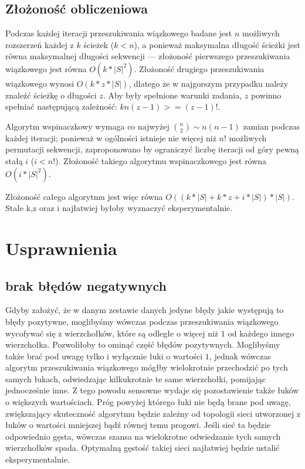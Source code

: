 \documentclass{article}
\begin{document}
\subsection{Złożoność obliczeniowa}
Podczas każdej iteracji przeszukiwania wiązkowego badane jest $n$ możliwych rozszerzeń każdej z $k$ ścieżek ($k<n$), a ponieważ maksymalna długość ścieżki jest równa maksymalnej długości sekwencji --- złożoność pierwszego przeszukiwania wiązkowego jest równa $O(k*|S|^2)$. Złożoność drugiego przeszukiwania wiązkowego wynosi $O(k*z*|S|)$, dlatego że w najgorszym przypadku należy znaleźć ścieżkę o długości $z$. Aby były spełnione warunki zadania, $z$ powinno spełniać następującą zależność: $kn(z-1)>=(z-1)!$.

Algorytm wspinaczkowy wymaga co najwyżej ${{n}\choose{2}}\sim n(n-1)$ zamian podczas każdej iteracji; ponieważ w ogólności istnieje nie więcej niż $n!$ możliwych permutacji sekwencji, zaproponowano by ograniczyć liczbę iteracji od góry pewną stałą $i$ ($i<n!$). Złożoność takiego algorytmu wspinaczkowego jest równa $O(i*|S|^2)$.

Złożoność całego algorytmu jest więc równa $O((k*|S|+k*z+i*|S|)*|S|)$. Stałe k,z oraz i najłatwiej byłoby wyznaczyć eksperymentalnie.
\section{Usprawnienia}
\subsection{brak błędów negatywnych}
Gdyby założyć, że w danym zestawie danych jedyne błędy jakie występują to błędy pozytywne, moglibyśmy wówczas podczas przeszukiwania wiązkowego wycofywać się z wierzchołków, które są odległe o więcej niż $1$ od każdego innego wierzchołka. Pozwoliłoby to ominąć część błędów pozytywnych. Moglibyśmy także brać pod uwagę tylko i wyłącznie łuki o wartości $1$, jednak wówczas algorytm przeszukiwania wiązkowego mógłby wielokrotnie przechodzić po tych samych łukach, odwiedzając kilkukrotnie te same wierzchołki, pomijając jednocześnie inne. Z tego powodu sensowne wydaje się pozostawienie także łuków o większych wartościach. Próg powyżej którego łuki nie będą brane pod uwagę, zwiększający skuteczność algorytmu będzie zależny od topologii sieci utworzonej z łuków o wartości mniejszej bądź równej temu progowi. Jeśli sieć ta będzie odpowiednio gęsta, wówczas szansa na wielokrotne odwiedzanie tych samych wierzchołków spada. Optymalną gęstość takiej sieci najłatwiej będzie ustalić eksperymentalnie.
\end{document}
